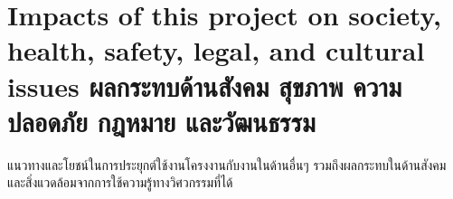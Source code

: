 
\section{\ifenglish%
Impacts of this project on society, health, safety, legal, and cultural issues
\else%
ผลกระทบด้านสังคม สุขภาพ ความปลอดภัย กฎหมาย และวัฒนธรรม
\fi}

แนวทางและโยชน์ในการประยุกต์ใช้งานโครงงานกับงานในด้านอื่นๆ รวมถึงผลกระทบในด้านสังคมและสิ่งแวดล้อมจากการใช้ความรู้ทางวิศวกรรมที่ได้
